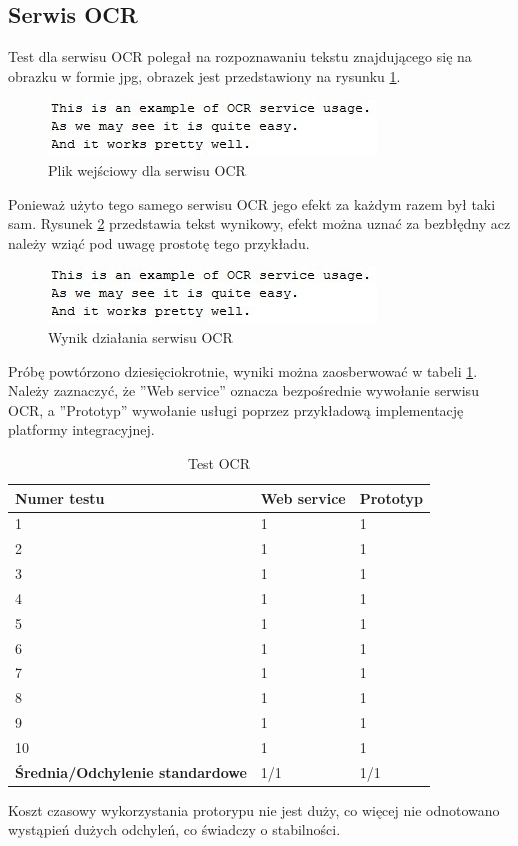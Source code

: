 \subsection{Serwis OCR}
Test dla serwisu OCR polegał na rozpoznawaniu tekstu znajdującego się na obrazku w formie jpg, obrazek jest przedstawiony na rysunku \ref{fig:OCRExample}. 
\begin{figure}[!h]
\centering
\includegraphics[scale=0.9]{OCRExample.jpg}
\caption{Plik wejściowy dla serwisu OCR}\label{fig:OCRExample}
\end{figure}
Ponieważ użyto tego samego serwisu OCR jego efekt za każdym razem był taki sam. Rysunek \ref{fig:OCRResult} przedstawia tekst wynikowy, efekt można uznać za bezbłędny acz należy wziąć pod uwagę prostotę tego przykładu.
\begin{figure}[!h]
\centering
\includegraphics[scale=0.9]{OCRExample.jpg}
\caption{Wynik działania serwisu OCR}\label{fig:OCRResult}
\end{figure}
Próbę powtórzono dziesięciokrotnie, wyniki można zaosberwować w tabeli \ref{fig:ocr}. Należy zaznaczyć, że ''Web service'' oznacza bezpośrednie wywołanie serwisu OCR, a ''Prototyp'' wywołanie usługi poprzez przykładową implementację platformy integracyjnej.
\begin{center}
	\begin{table}[h]
	\label{fig:ocr}
	\caption{Test OCR}
	\centering
	\begin{tabular}{| l | l | l |}	
		\hline
		\textbf{Numer testu} & \textbf{Web service} & \textbf{Prototyp} \\ \hline
		1 & 1 & 1\\ \hline
		2 & 1 & 1\\ \hline
		3 & 1 & 1\\ \hline
		4 & 1 & 1\\ \hline
		5 & 1 & 1\\ \hline
		6 & 1 & 1\\ \hline
		7 & 1 & 1\\ \hline
		8 & 1 & 1\\ \hline
		9 & 1 & 1\\ \hline
		10 & 1 & 1\\ \hline
		\textbf{Średnia/Odchylenie standardowe} & 1/1 & 1/1\\ 
		\hline
	\end{tabular}
	\end{table}
\end{center}
Koszt czasowy wykorzystania protorypu nie jest duży, co więcej nie odnotowano wystąpień dużych odchyleń, co świadczy o stabilności. 

